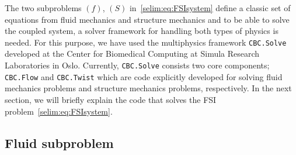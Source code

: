 The two subproblems $(f)$, $(S)$ in~\eqref{selim:eq:FSIsystem} define
a classic set of equations from fluid mechanics and structure
mechanics and to be able to solve the coupled system, a solver
framework for handling both types of physics is needed. For this
purpose, we have used the multiphysics framework \texttt{CBC.Solve}
developed at the Center for Biomedical Computing at Simula Research
Laboratories in Oslo. Currently, \texttt{CBC.Solve} consists two core
components; \texttt{CBC.Flow} and \texttt{CBC.Twist} which are code
explicitly developed for solving fluid mechanics problems and
structure mechanics problems, respectively.  In the next section, we
will briefly explain the code that solves the FSI
problem~\eqref{selim:eq:FSIsystem}. 

\subsection{Fluid subproblem}

